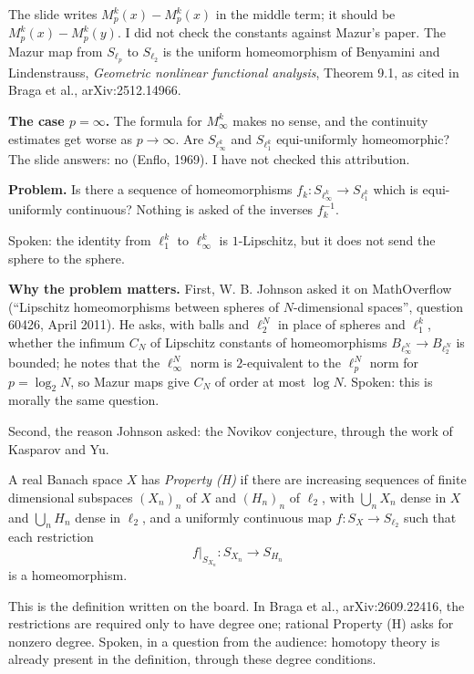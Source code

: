 \begin{remark}
\label{remark-mazur-slide-typo}
The slide writes $M_p^k(x) - M_p^k(x)$ in the
middle term; it should be
$M_p^k(x) - M_p^k(y)$. I did not check the
constants against Mazur's paper. The Mazur
map from $S_{\ell_p}$ to $S_{\ell_2}$ is the
uniform homeomorphism of Benyamini and
Lindenstrauss, \emph{Geometric nonlinear
functional analysis}, Theorem 9.1, as cited
in Braga et al., arXiv:2512.14966.
\end{remark}

\medskip\noindent
{\bf The case $p = \infty$.} The formula for
$M_\infty^k$ makes no sense, and the
continuity estimates get worse as
$p \to \infty$. Are $S_{\ell_\infty^k}$ and
$S_{\ell_1^k}$ equi-uniformly homeomorphic?
The slide answers: no (Enflo, 1969). I have
not checked this attribution.

\medskip\noindent
{\bf Problem.} Is there a sequence of
homeomorphisms
$f_k : S_{\ell_\infty^k} \to S_{\ell_1^k}$
which is equi-uniformly continuous? Nothing
is asked of the inverses $f_k^{-1}$.

Spoken: the identity from $\ell_1^k$ to
$\ell_\infty^k$ is $1$-Lipschitz, but it does
not send the sphere to the sphere.

\medskip\noindent
{\bf Why the problem matters.} First, W. B.
Johnson asked it on MathOverflow
(``Lipschitz homeomorphisms between spheres
of $N$-dimensional spaces'', question 60426,
April 2011). He asks, with balls and
$\ell_2^N$ in place of spheres and
$\ell_1^k$, whether the infimum $C_N$ of
Lipschitz constants of homeomorphisms
$B_{\ell_\infty^N} \to B_{\ell_2^N}$ is
bounded; he notes that the $\ell_\infty^N$
norm is $2$-equivalent to the $\ell_p^N$ norm
for $p = \log_2 N$, so Mazur maps give
$C_N$ of order at most $\log N$. Spoken: this
is morally the same question.

Second, the reason Johnson asked: the Novikov
conjecture, through the work of Kasparov and
Yu.

\begin{definition}
\label{definition-property-h}
A real Banach space $X$ has
\emph{Property (H)} if there are increasing
sequences of finite dimensional subspaces
$(X_n)_n$ of $X$ and $(H_n)_n$ of $\ell_2$,
with $\bigcup_n X_n$ dense in $X$ and
$\bigcup_n H_n$ dense in $\ell_2$, and a
uniformly continuous map
$f : S_X \to S_{\ell_2}$ such that each
restriction
$$
f|_{S_{X_n}} : S_{X_n} \to S_{H_n}
$$
is a homeomorphism.
\end{definition}

\begin{remark}
\label{remark-property-h-degree-one}
This is the definition written on the board.
In Braga et al., arXiv:2609.22416, the
restrictions are required only to have
degree one; rational Property (H) asks for
nonzero degree. Spoken, in a question from
the audience: homotopy theory is already
present in the definition, through these
degree conditions.
\end{remark}

